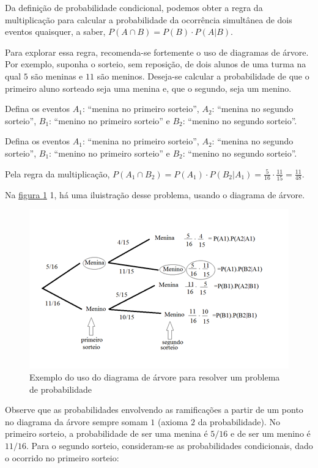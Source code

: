 \begin{paginatexto}
Da definição de probabilidade condicional, podemos obter a regra da multiplicação para calcular a probabilidade da ocorrência simultânea de dois eventos quaisquer, a saber, $P(A\cap B)=P(B)\cdot P(A|B)$.

Para explorar essa regra, recomenda-se fortemente o uso de diagramas de árvore. Por exemplo, suponha o sorteio, sem reposição, de dois alunos de uma turma na qual $5$ são meninas e $11$ são meninos. Deseja-se calcular a probabilidade de que o primeiro aluno sorteado seja uma menina e, que o segundo, seja um menino.

Defina os eventos $A_1$: “menina no primeiro sorteio”, $A_2$: “menina no segundo sorteio”, $B_1$: “menino no primeiro sorteio”{} e $B_2$: “menino no segundo sorteio”.

Defina os eventos $A_1$: “menina no primeiro sorteio”, $A_2$: “menina no segundo sorteio”, $B_1$: “menino no primeiro sorteio”{} e $B_2$: “menino no segundo sorteio”.

Pela regra da multiplicação, $P(A_1\cap B_2)=P(A_1)\cdot P(B_2|A_1)=\frac{5}{16}\cdot\frac{11}{15}=\frac{11}{48}$.

Na \hyperref[exemploarvore1]{figura \ref{exemploarvore1}} 1, há uma iluistração desse problema, usando o diagrama de árvore.
\begin{figure}[H]
\centering

\includegraphics[width=\linewidth]{exemploarvore1.png}
\caption{Exemplo do uso do diagrama de árvore para resolver um problema de probabilidade}
\label{exemploarvore1}
\end{figure}

Observe que as probabilidades envolvendo as ramificações a partir de um ponto no diagrama da árvore sempre somam $1$ (axioma $2$ da probabilidade). No primeiro sorteio, a probabilidade de ser uma menina é $5/16$ e de ser um menino é $11/16$. Para o segundo sorteio, consideram-se as probabilidades condicionais, dado o ocorrido no primeiro sorteio:


\end{paginatexto}
